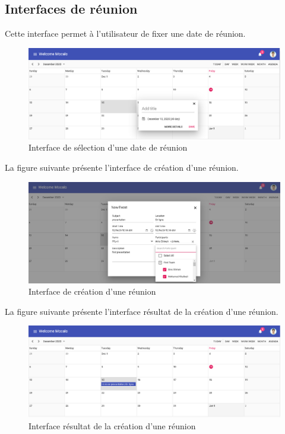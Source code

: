 \subsection{	Interfaces de réunion}
\hspace{4mm}Cette interface permet à l’utilisateur de fixer une date de réunion. \newline
\begin{figure}[h]
    \centering
    \includegraphics[scale=0.35]{figures/a6.png}
    \caption{Interface de sélection d'une date de  réunion}
    \label{fig:interface_reunion}
\end{figure}\newline
\hspace{4mm}La figure suivante présente l’interface de création d'une réunion.  \newline
\begin{figure}[h]
    \centering
    \includegraphics[scale=0.35]{figures/a7.png}
    \caption{Interface de création d'une réunion}
    \label{fig:interface_creation_reunion}
\end{figure}\newpage
\par La figure suivante présente l’interface résultat de la création d'une réunion.
\begin{figure}[h]
    \centering
    \includegraphics[scale=0.35]{figures/a8.png}
    \caption{Interface résultat de la création d'une réunion}
    \label{fig:interface_resultcreation_reunion}
\end{figure}
